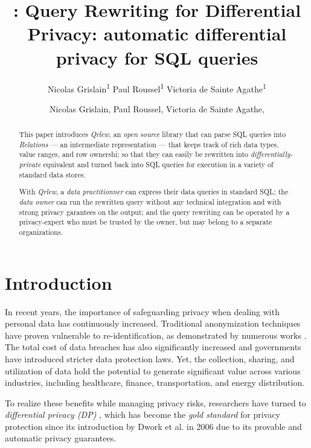 \documentclass[letterpaper]{article} %
\title{\qrlew: Query Rewriting for Differential Privacy}
\author{
    Nicolas Grislain\textsuperscript{\rm 1}
    Paul Roussel\textsuperscript{\rm 1}
    Victoria de Sainte Agathe\textsuperscript{\rm 1}
}
\title{\qrlew: automatic differential privacy for SQL queries}
\author {
    Nicolas Grislain,
    Paul Roussel,
    Victoria de Sainte Agathe,
}
\newcommand{\qrlew}{\emph{Qrlew}}
\begin{document}
\maketitle

\begin{abstract}
This paper introduces \qrlew{}, an \emph{open source} library that can parse SQL queries into \emph{Relations} --- an intermediate representation --- that keeps track of rich data types, value ranges, and row ownershi; so that they can easily be rewritten into \emph{differentially-private} equivalent and turned back into SQL queries for execution in a variety of standard data stores.

With \qrlew{}, a \emph{data practitionner} can express their data queries in standard SQL; the \emph{data owner} can run the rewritten query without any technical integration and with strong privacy garantees on the output; and the query rewriting can be operated by a privacy-expert who must be trusted by the owner, but may belong to a separate organizations.
\end{abstract}

\section{Introduction}

In recent years, the importance of safeguarding privacy when dealing with personal data has continuously increased.
Traditional anonymization techniques have proven vulnerable to re-identification, as demonstrated by numerous works \cite{archie2018s, dwork2017exposed, narayanan2008robust, sweeney2013identifying}.
The total cost of data breaches has also significantly increased \cite{ibm2023cost} and governments have introduced stricter data protection laws.
Yet, the collection, sharing, and utilization of data hold the potential to generate significant value across various industries, including healthcare, finance, transportation, and energy distribution.

To realize these benefits while managing privacy risks, researchers have turned to \emph{differential privacy (DP)} \cite{wood2018differential, dwork2014algorithmic}, which has become the \emph{gold standard} for privacy protection since its introduction by Dwork et al. in 2006 \cite{dwork2006calibrating} due to its provable and automatic privacy guarantees.
\end{document}
